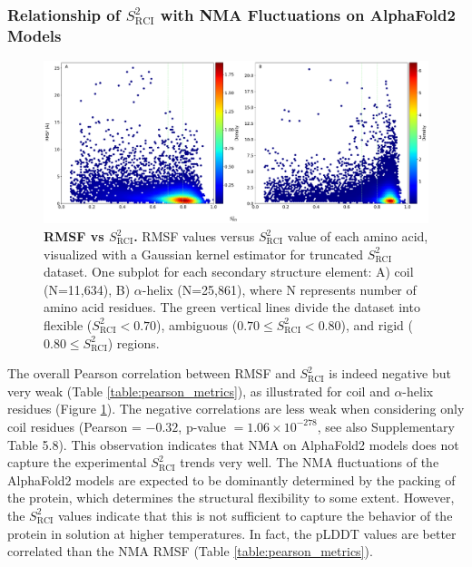 \subsubsection{Relationship of $S^2_{\text{RCI}}$ with NMA Fluctuations on AlphaFold2 Models}

\begin{figure}[htb!]
    \centering
    \includegraphics[width=\textwidth]{pLDDT/plddt_figures/figures_bhawna/main_scatterplot_tr_RMSF_rciS2_C_H_hexbin.pdf}
    \caption{\textbf{RMSF vs $S^{2}_{\text{RCI}}$.} RMSF values versus $S^{2}_{\text{RCI}}$ value of each amino acid, visualized with a Gaussian kernel estimator for truncated $S^{2}_{\text{RCI}}$ dataset. One subplot for each secondary structure element: A) coil (N=11,634), B) $\alpha$-helix (N=25,861), where N represents number of amino acid residues. The green vertical lines divide the dataset into flexible ($S^2_{\text{RCI}} < 0.70$), ambiguous ($0.70 \le S^2_{\text{RCI}} < 0.80$), and rigid ($0.80 \leq S^2_{\text{RCI}}$) regions.
    }
    \label{fig:RMSF_vs_S2RCI}
\end{figure}

The overall Pearson correlation between RMSF and $S^2_{\text{RCI}}$ is indeed negative but very weak (Table \ref{table:pearson_metrics}), as illustrated for coil and $\alpha$-helix residues (Figure \ref{fig:RMSF_vs_S2RCI}). The negative correlations are less weak when considering only coil residues (Pearson = $-0.32$, p-value $=1.06\times10^{-278}$, see also Supplementary Table 5.8).
This observation indicates that NMA on AlphaFold2 models does not capture the experimental $S^2_{\text{RCI}}$ trends very well. The NMA fluctuations of the AlphaFold2 models are expected to be dominantly determined by the packing of the protein, which determines the structural flexibility to some extent. However, the $S^2_{\text{RCI}}$ values indicate that this is not sufficient to capture the behavior of the protein in solution at higher temperatures. In fact, the pLDDT values are better correlated than the NMA RMSF (Table \ref{table:pearson_metrics}).

